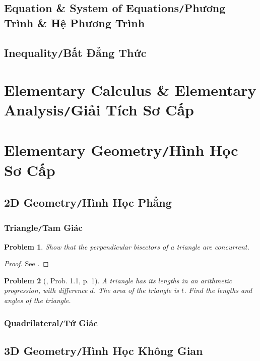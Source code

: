 \documentclass{article}
\numberwithin{equation}{section}
\newtheorem{problem}{Problem}[section]
\begin{document}
\subsection{Equation \& System of Equations\texttt{/}Phương Trình \& Hệ Phương Trình}

\subsection{Inequality\texttt{/}Bất Đẳng Thức}

\section{Elementary Calculus \& Elementary Analysis\texttt{/}Giải Tích Sơ Cấp}

\section{Elementary Geometry\texttt{/}Hình Học Sơ Cấp}

\subsection{2D Geometry\texttt{/}Hình Học Phẳng}

\subsubsection{Triangle\texttt{/}Tam Giác}
\begin{problem}
	Show that the perpendicular bisectors of a triangle are concurrent.
\end{problem}

\begin{proof}
	See \cite[p. ix]{Tao2006}.
\end{proof}

\begin{problem}[\cite{Tao2006}, Prob. 1.1, p. 1]
	A triangle has its lengths in an arithmetic progression, with difference $d$. The area of the triangle is $t$. Find the lengths and angles of the triangle.
\end{problem}

\subsubsection{Quadrilateral\texttt{/}Tứ Giác}

\subsection{3D Geometry\texttt{/}Hình Học Không Gian}
\end{document}
